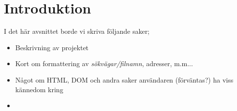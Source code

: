 \section{Introduktion}
I det här avsnittet borde vi skriva följande saker;
\begin{itemize}
  \item Beskrivning av projektet
  \item Kort om formattering av {\it sökvägar/filnamn}, adresser, m.m...
  \item Något om HTML, DOM och andra saker användaren (förväntas?) ha viss
    kännedom kring
  \item 
\end{itemize}
